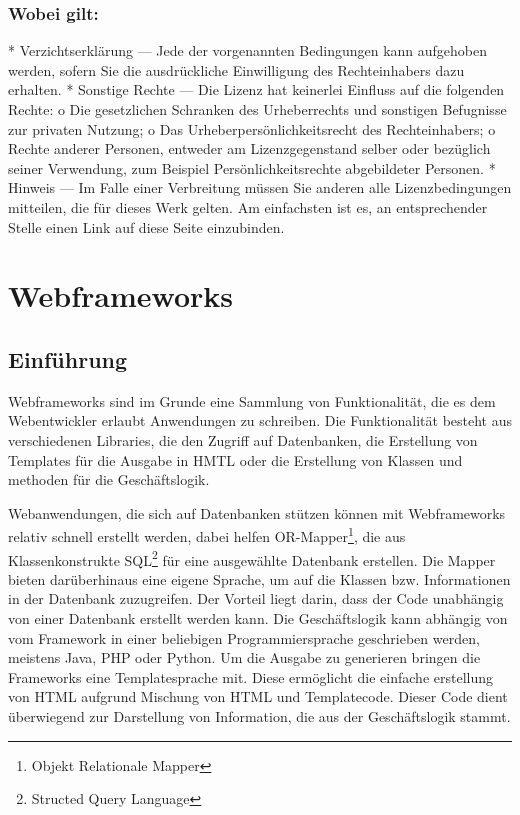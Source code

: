 \documentclass[titlepage, 12pt,a4paper]{scrreprt}
\begin{document}
\subsection*{Wobei gilt:}
    *   Verzichtserklärung  — Jede der vorgenannten Bedingungen kann aufgehoben werden, sofern Sie die ausdrückliche Einwilligung des Rechteinhabers dazu erhalten.
    * Sonstige Rechte — Die Lizenz hat keinerlei Einfluss auf die folgenden Rechte:
          o Die gesetzlichen Schranken des Urheberrechts und sonstigen Befugnisse zur privaten Nutzung;
          o Das Urheberpersönlichkeitsrecht des Rechteinhabers;
          o Rechte anderer Personen, entweder am Lizenzgegenstand selber oder bezüglich seiner Verwendung, zum Beispiel Persönlichkeitsrechte abgebildeter Personen.
    * Hinweis — Im Falle einer Verbreitung müssen Sie anderen alle Lizenzbedingungen mitteilen, die für dieses Werk gelten. Am einfachsten ist es, an entsprechender Stelle einen Link auf diese Seite einzubinden.


\newpage

\tableofcontents
\newpage

\chapter{Webframeworks}
\section{Einführung}
Webframeworks sind im Grunde eine Sammlung von Funktionalität, die es dem
Webentwickler erlaubt Anwendungen zu schreiben. Die Funktionalität besteht aus
verschiedenen Libraries, die den Zugriff auf Datenbanken, die Erstellung von
Templates für die Ausgabe in HMTL oder die Erstellung von Klassen und methoden
für die Geschäftslogik. 

Webanwendungen, die sich auf Datenbanken stützen können mit Webframeworks
relativ schnell erstellt werden, dabei helfen OR-Mapper\footnote{Objekt
Relationale Mapper}, die aus Klassenkonstrukte SQL\footnote{Structed Query
Language} für eine ausgewählte Datenbank erstellen. Die Mapper bieten
darüberhinaus eine eigene Sprache, um auf die Klassen bzw. Informationen in der
Datenbank zuzugreifen. Der Vorteil liegt darin, dass der Code unabhängig von
einer Datenbank erstellt werden kann. Die Geschäftslogik kann abhängig von vom
Framework in einer beliebigen Programmiersprache geschrieben werden, meistens
Java, PHP oder Python. Um die Ausgabe zu generieren bringen die Frameworks eine
Templatesprache mit. Diese ermöglicht die einfache erstellung von HTML aufgrund
Mischung von HTML und Templatecode. Dieser Code dient überwiegend zur
Darstellung von Information, die aus der Geschäftslogik stammt. 
\end{document}
